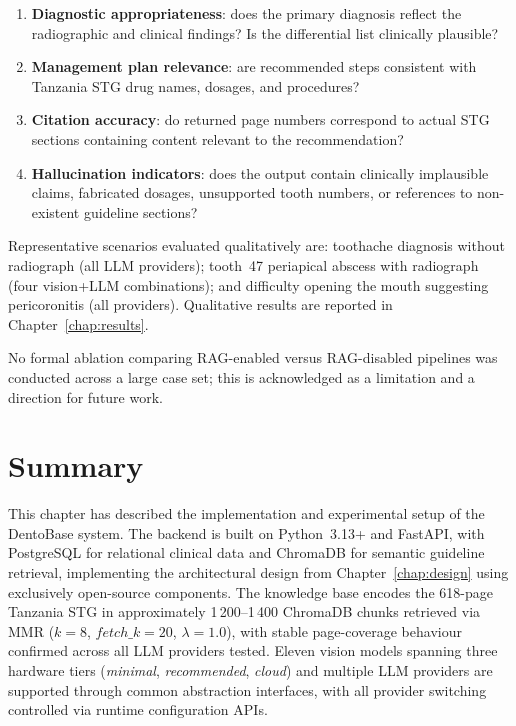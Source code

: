 \documentclass[12pt,a4paper]{report}
\begin{document}
	\begin{enumerate}
		\item \textbf{Diagnostic appropriateness}: does the primary diagnosis
		reflect the radiographic and clinical findings?  Is the
		differential list clinically plausible?
		\item \textbf{Management plan relevance}: are recommended steps
		consistent with Tanzania STG drug names, dosages, and procedures?
		\item \textbf{Citation accuracy}: do returned page numbers correspond
		to actual STG sections containing content relevant to the
		recommendation?
		\item \textbf{Hallucination indicators}: does the output contain
		clinically implausible claims, fabricated dosages, unsupported
		tooth numbers, or references to non-existent guideline sections?
	\end{enumerate}
	
	Representative scenarios evaluated qualitatively are: toothache
	diagnosis without radiograph (all LLM providers); tooth~47 periapical
	abscess with radiograph (four vision+LLM combinations); and difficulty
	opening the mouth suggesting pericoronitis (all providers).
	Qualitative results are reported in Chapter~\ref{chap:results}.
	
	No formal ablation comparing RAG-enabled versus RAG-disabled pipelines
	was conducted across a large case set; this is acknowledged as a
	limitation and a direction for future work.
	
	\section{Summary}
	\label{sec:ch4_summary}
	
	This chapter has described the implementation and experimental setup of
	the DentoBase system.  The backend is built on Python~3.13+ and FastAPI,
	with PostgreSQL for relational clinical data and ChromaDB for semantic
	guideline retrieval, implementing the architectural design from
	Chapter~\ref{chap:design} using exclusively open-source components.  The knowledge base encodes
	the 618-page Tanzania STG in approximately 1\,200--1\,400 ChromaDB
	chunks retrieved via MMR ($k{=}8$, $\mathit{fetch\_k}{=}20$,
	$\lambda{=}1.0$), with stable page-coverage behaviour confirmed across
	all LLM providers tested.  Eleven vision models spanning three hardware
	tiers (\textit{minimal}, \textit{recommended}, \textit{cloud}) and
	multiple LLM providers are supported through common abstraction
	interfaces, with all provider switching controlled via runtime
	configuration APIs.
	
\end{document}
